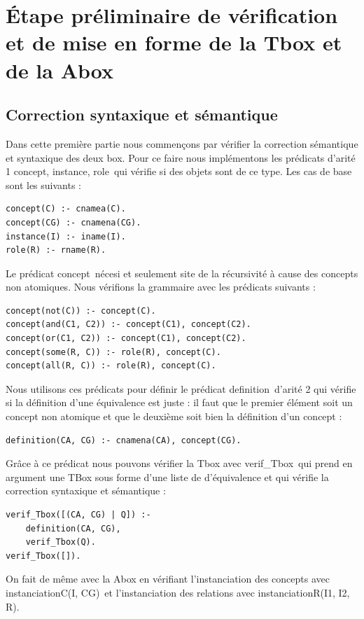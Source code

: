 \documentclass{article}
\begin{document}
\section{\'Etape préliminaire de vérification et de mise en forme de la Tbox et de la Abox}
\subsection{Correction syntaxique et sémantique}
Dans cette première partie nous commençons par vérifier la correction sémantique et syntaxique des deux box. Pour ce faire nous implémentons les prédicats d'arité 1 \color{blue}concept, instance, role\color{black}\ qui vérifie si des objets sont de ce type. Les cas de base sont les suivants :

\begin{verbatim}
concept(C) :- cnamea(C).
concept(CG) :- cnamena(CG). 
instance(I) :- iname(I).
role(R) :- rname(R). 
\end{verbatim}

Le prédicat \color{blue}concept\color{black}\ nécesi et seulement site de la récursivité à cause des concepts non atomiques. Nous vérifions la grammaire avec les prédicats suivants :

\begin{verbatim}
concept(not(C)) :- concept(C).
concept(and(C1, C2)) :- concept(C1), concept(C2).
concept(or(C1, C2)) :- concept(C1), concept(C2).
concept(some(R, C)) :- role(R), concept(C).
concept(all(R, C)) :- role(R), concept(C).
\end{verbatim}

Nous utilisons ces prédicats pour définir le prédicat \color{blue}definition\color{black}\ d'arité 2 qui vérifie si la définition d'une équivalence est juste : il faut que le premier élément soit un concept non atomique et que le deuxième soit bien la définition d'un concept :
\begin{verbatim}
definition(CA, CG) :- cnamena(CA), concept(CG).
\end{verbatim}

Grâce à ce prédicat nous pouvons vérifier la Tbox avec \color{blue}verif\_Tbox\color{black}\ qui prend en argument une TBox sous forme d'une liste de d'équivalence et qui vérifie la correction syntaxique et sémantique : 
\begin{verbatim}
verif_Tbox([(CA, CG) | Q]) :- 
    definition(CA, CG), 
    verif_Tbox(Q).
verif_Tbox([]).
\end{verbatim}
On fait de même avec la Abox en vérifiant l'instanciation des concepts avec \color{blue}instanciationC(I, CG)\color{black}\ et l'instanciation des relations avec \color{blue}instanciationR(I1, I2, R)\color{black}.
\end{document}
